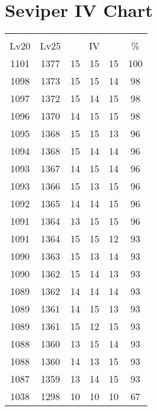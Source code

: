 \documentclass{article}%
\begin{document}
%
\normalsize%
\section{Seviper IV Chart}%
\label{sec:Seviper IV Chart}%
\renewcommand{\arraystretch}{1.5}%
\begin{tabular}{|c|c|c|c|c|c|}%
\hline%
\multicolumn{6}{|c|}{\textcolor{white}{ 
\linebreak{Seviper}
}%
\cellcolor{black}}\\%
\multicolumn{1}{|c}{Lv20}&\multicolumn{1}{c|}{Lv25}&\multicolumn{3}{c|}{IV}&\multicolumn{1}{|c|}{\%}\\%
\hline%
\rowcolor{color100}%
1101&1377&15&15&15&100\\%
\hline%
\rowcolor{color98}%
1098&1373&15&15&14&98\\%
\hline%
\rowcolor{color98}%
1097&1372&15&14&15&98\\%
\hline%
\rowcolor{color98}%
1096&1370&14&15&15&98\\%
\hline%
\rowcolor{color96}%
1095&1368&15&15&13&96\\%
\hline%
\rowcolor{color96}%
1094&1368&15&14&14&96\\%
\hline%
\rowcolor{color96}%
1093&1367&14&15&14&96\\%
\hline%
\rowcolor{color96}%
1093&1366&15&13&15&96\\%
\hline%
\rowcolor{color96}%
1092&1365&14&14&15&96\\%
\hline%
\rowcolor{color96}%
1091&1364&13&15&15&96\\%
\hline%
\rowcolor{color93}%
1091&1364&15&15&12&93\\%
\hline%
\rowcolor{color93}%
1090&1363&15&13&14&93\\%
\hline%
\rowcolor{color93}%
1090&1362&15&14&13&93\\%
\hline%
\rowcolor{color93}%
1089&1362&14&14&14&93\\%
\hline%
\rowcolor{color93}%
1089&1361&14&15&13&93\\%
\hline%
\rowcolor{color93}%
1089&1361&15&12&15&93\\%
\hline%
\rowcolor{color93}%
1088&1360&13&15&14&93\\%
\hline%
\rowcolor{color93}%
1088&1360&14&13&15&93\\%
\hline%
\rowcolor{color93}%
1087&1359&13&14&15&93\\%
\hline%
\rowcolor{color91}%
1038&1298&10&10&10&67\\%
\end{tabular}

%
\end{document}
